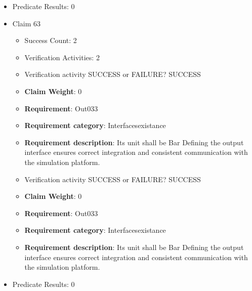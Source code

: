 \documentclass{article}
\begin{document}
\begin{itemize}
\begin{itemize}
					\item Verification activity SUCCESS or FAILURE? SUCCESS
					\item \textbf{Claim Weight}: 0
						\item \textbf{Requirement}: Out032 
						\item \textbf{Requirement category}: Interfacesexistance 
						\item \textbf{Requirement description}: Its unit shall be Bar Defining the output interface ensures correct integration and consistent communication with the simulation platform.
					
				\end{itemize}
				
									    
				\item Predicate Results: 0

  				  \item Claim 63
				\begin{itemize}
			    	\item Success Count: 2 
			    	\item Verification Activities: 2
					\item Verification activity SUCCESS or FAILURE? SUCCESS
					\item \textbf{Claim Weight}: 0
						\item \textbf{Requirement}: Out033 
						\item \textbf{Requirement category}: Interfacesexistance 
						\item \textbf{Requirement description}: Its unit shall be Bar Defining the output interface ensures correct integration and consistent communication with the simulation platform.
					
					\item Verification activity SUCCESS or FAILURE? SUCCESS
					\item \textbf{Claim Weight}: 0
						\item \textbf{Requirement}: Out033 
						\item \textbf{Requirement category}: Interfacesexistance 
						\item \textbf{Requirement description}: Its unit shall be Bar Defining the output interface ensures correct integration and consistent communication with the simulation platform.
					
				\end{itemize}
				
									    
				\item Predicate Results: 0


\end{itemize}
\end{document}
